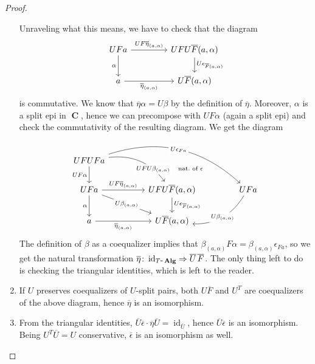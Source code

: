 \documentclass[a4paper,11pt,fullpage,oneside,openany]{amsbook}
\DeclareMathOperator{\Alg}{\mathbf{Alg}}
\DeclareMathOperator{\C}{\mathbf{C}}
\DeclareMathOperator{\id}{id}
\theoremstyle{definition}
\theoremstyle{definition}
\theoremstyle{remark}
\begin{document}
\begin{proof}
\begin{enumerate}
	Unraveling what this means, we have to check that the diagram
	\[
	\begin{tikzcd}[column sep=1.5cm]
	UFa\ar[r, "UF\overline{\eta}_{(a,\alpha)}"]\ar[d,"\alpha"']
	& UFU\overline{F}(a,\alpha)\ar[d, "U\epsilon_{\overline{F}(a,\alpha)}"] \\
	a\ar[r, "\overline{\eta}_{(a,\alpha)}"']
	& U\overline{F}(a,\alpha)
	\end{tikzcd}
	\]	
	is commutative. We know that $\overline{\eta}\alpha=U\beta$ by the definition of $\overline{\eta}$. Moreover, $\alpha$ is a split epi in $\C$, hence we can precompose with $UF\alpha$ (again a split epi) and check the commutativity of the resulting diagram. We get the diagram
	\[
	\begin{tikzcd}[column sep=1.5cm]
	UFUFa\arrow[d, "UF\alpha"'] \arrow[rd, bend left, near end, "UFU\beta_{(a,\alpha)}"description] \arrow[rrd, bend left, "U\epsilon_{Fa}"description] &            & \ar[lld,draw=none, near start,"\hspace{-1.5cm}\text{nat.\ of\ } \epsilon" description]  \\
	UFa\arrow[d, "\alpha"'] \arrow[r, "UF\overline{\eta}_{(a,\alpha)}"] \arrow[rd, "U\beta_{(a,\alpha)}"description]                        & UFU\overline{F}(a,\alpha)  \arrow[d, "U\epsilon_{\overline{F}(a,\alpha)}"] &        UFa           \arrow[ld, bend left, "U\beta_{(a,\alpha)}"description]      \\
	a\arrow[r, "\overline{\eta}_{(a,\alpha)}"']                                             &     U\overline{F}(a,\alpha)       &                        
	\end{tikzcd}
	\]
	The definition of $\beta$ as a coequalizer implies that $\beta_{(a,\alpha)}F\alpha=\beta_{(a,\alpha)}\epsilon_{Fa}$, so we get the natural transformation $\overline{\eta}\colon\id_{T\mbox{-}\Alg}\Rightarrow\overline{U}\hspace{.5mm}\overline{F}$. The only thing left to do is checking the triangular identities, which is left to the reader.
	
	\item If $U$ preserves coequalizers of $U$-split pairs, both $U\overline{F}$ and $U^T$ are coequalizers of the above diagram, hence $\overline{\eta}$ is an isomorphism.
	
	\item From the triangular identities, $\overline{U}\overline{\epsilon}\cdot\overline{\eta}\overline{U}=\id_{\overline{U}}$, hence $\overline{U}\overline{\epsilon}$ is an isomorphism. Being $U^T\overline{U}=U$ conservative, $\overline{\epsilon}$ is an isomorphism as well. \qedhere
\end{enumerate}
\end{proof}
\end{document}
